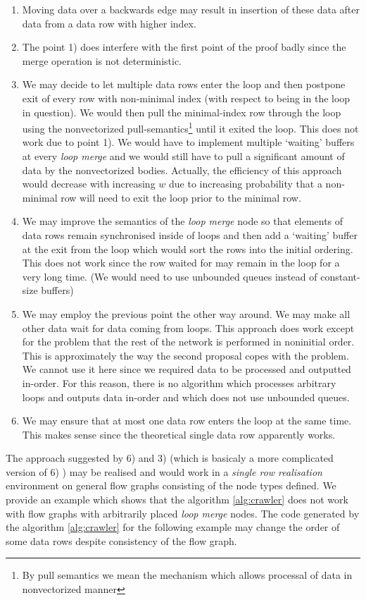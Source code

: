\begin{enumerate}
    \item Moving data over a backwards edge may result in insertion of these data after data from a data row with higher index. 
    \item The point 1) does interfere with the first point of the proof badly since the merge operation is not deterministic. 
    \item We may decide to let multiple data rows enter the loop and then postpone exit of every row with non-minimal index (with respect to being in the loop in question). We would then pull the minimal-index row through the loop using the nonvectorized pull-semantics\footnote{By pull semantics we mean the mechanism which allows processal of data in nonvectorized manner} until it exited the loop. This does not work due to point 1). We would have to implement multiple `waiting' buffers at every \emph{loop merge} and we would still have to pull a significant amount of data by the nonvectorized bodies. Actually, the efficiency of this approach would decrease with increasing $w$ due to increasing probability that a non-minimal row will need to exit the loop prior to the minimal row.
    \item We may improve the semantics of the \emph{loop merge} node so that elements of data rows remain synchronised inside of loops and then add a `waiting' buffer at the exit from the loop which would sort the rows into the initial ordering. This does not work since the row waited for may remain in the loop for a very long time. (We would need to use unbounded queues instead of constant-size buffers)
    \item We may employ the previous point the other way around. We may make all other data wait for data coming from loops. This approach does work except for the problem that the rest of the network is performed in noninitial order. This is approximately the way the second proposal copes with the problem. We cannot use it here since we required data to be processed and outputted in-order. For this reason, there is no algorithm which processes arbitrary loops and outputs data in-order and which does not use unbounded queues.
    \item We may ensure that at most one data row enters the loop at the same time. This makes sense since the theoretical single data row apparently works. 
\end{enumerate}

The approach suggested by 6) and 3) (which is basicaly a more complicated version of 6) ) may be realised and would work in a \emph{single row realisation} environment on general flow graphs consisting of the node types defined. We provide an example which shows that the algorithm \ref{alg:crawler} does not work with flow graphs with arbitrarily placed \emph{loop merge} nodes. The code generated by the algorithm \ref{alg:crawler} for the following example may change the order of some data rows despite consistency of the flow graph. 

